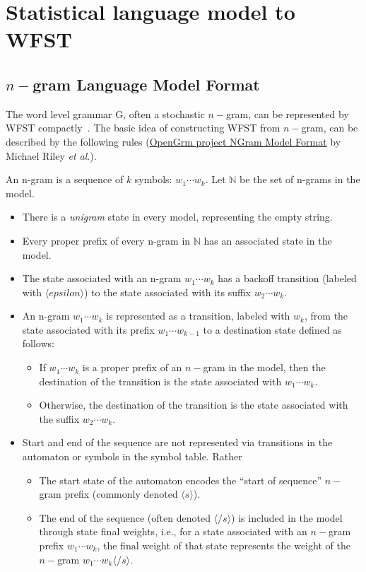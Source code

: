 \section{Statistical language model to WFST}
\label{sec:grmmod}

\subsection{$n-$gram Language Model Format}
\label{subsubsec:ngramformat}

The word level grammar G, often a stochastic $n-$gram, can be represented by WFST compactly~\cite{allauzen2003generalized}. The basic idea of constructing WFST from $n-$gram, can be described by the following rules (\href{http://openfst.cs.nyu.edu/twiki/bin/view/GRM/NGramModelFormat}{OpenGrm project NGram Model Format} by Michael Riley \textit{et al}.). \vspace{5mm}

An n-gram is a sequence of $k$ symbols: $w_1\cdots{}w_k$. Let $\mathbb{N}$ be the set of n-grams in the model.

\begin{itemize}
\item
  There is a \textit{unigram} state in every model, representing the empty string.
\item
  Every proper prefix of every n-gram in $\mathbb{N}$ has an associated state in the model.
\item
  The state associated with an n-gram $w_1\cdots{}w_k$ has a backoff transition (labeled with $\langle epsilon\rangle$) to the state associated with its suffix $w_2\cdots{}w_k$.
\item
  An n-gram $w_1\cdots{}w_k$ is represented as a transition, labeled with $w_k$, from the state associated with its prefix $w_1\cdots{}w_{k-1}$ to a destination state defined as follows:
  \begin{itemize}
  \item
    If $w_1\cdots{}w_k$ is a proper prefix of an $n-$gram in the model, then the destination of the transition is the state associated with $w_1\cdots{}w_k$.
  \item
    Otherwise, the destination of the transition is the state associated with the suffix $w_2\cdots{}w_k$.
  \end{itemize}
\item
  Start and end of the sequence are not represented via transitions in the automaton or symbols in the symbol table. Rather
  \begin{itemize}
  \item
    The start state of the automaton encodes the ``start of sequence'' $n-$gram prefix (commonly denoted $\langle s\rangle$).
  \item
    The end of the sequence (often denoted $\langle /s\rangle$) is included in the model through state final weights, i.e., for a state associated with an $n-$gram prefix $w_1\cdots{}w_k$, the final weight of that state represents the weight of the $n-$gram $w_1\cdots{}w_k \langle /s\rangle$.
  \end{itemize}
\end{itemize}

